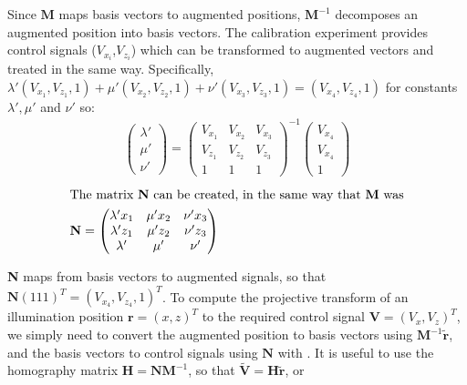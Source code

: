 Since \(\textbf{M}\) maps basis vectors to augmented positions, \(\textbf{M}^{-1}\) decomposes an augmented position into basis vectors.
The calibration experiment provides control signals (\(V_{x_i}\),\(V_{z_i}\)) which can be transformed to augmented vectors and treated in the same way.
Specifically, \({\lambda'(V_{x_1},V_{z_1},1) + \mu'(V_{x_2},V_{z_2},1)+ \nu'(V_{x_3},V_{z_3},1) = (V_{x_4},V_{z_4},1)}\) for constants \(\lambda' , \mu'\) and \(\nu' \) so:
\begin{align}
  \begin{pmatrix}
      \lambda'  \\
      \mu' \\
      \nu'
  \end{pmatrix}
  =
  \begin{pmatrix}
  V_{x_1}& V_{x_2} & V_{x_3} \\
  V_{z_1} & V_{z_2} & V_{z_3} \\
  1 & 1 & 1
  \end{pmatrix}^{-1}
  \begin{pmatrix}
  V_{x_4}  \\
  V_{x_4} \\
  1
  \end{pmatrix}
\end{align}
\begin{align}
  \intertext{The matrix \(\textbf{N}\) can be created, in the same way that \(\textbf{M}\) was}
\textbf{N} =
    \begin{pmatrix}
    \lambda' x_1 & \mu' x_2 & \nu' x_3 \\
    \lambda' z_1 & \mu' z_2 & \nu' z_3 \\
    \lambda' & \mu' & \nu'
    \end{pmatrix}
\end{align}

\textbf{N} maps from basis vectors to augmented signals, so that \(\textbf{N}{(111)}^T={\left( V_{x_4},V_{z_4}, 1 \right)}^T\).
To compute the projective transform of an illumination position \(\textbf{r}={(x,z)}^T\) to the required control signal \(\textbf{V} = {(V_x,V_z)}^T\), we simply need to convert the augmented position to basis vectors using \({\textbf{M}}^{-1}\widetilde{\textbf{r}}\), and the basis vectors to control signals using \(\textbf{N}\) with .
It is useful to use the \gls{homography} matrix \(\textbf{H} = \textbf{N}\textbf{M}^{-1}\), so that \(\widetilde{\textbf{V}} = \textbf{H} \widetilde{\textbf{r}}\), or

